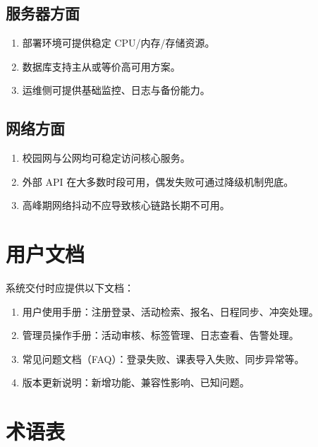 \documentclass[UTF8,a4paper,12pt,fontset=none]{ctexrep}
\begin{document}
\subsection{服务器方面}

\begin{enumerate}[leftmargin=2.5em]
\item 部署环境可提供稳定 CPU/内存/存储资源。
\item 数据库支持主从或等价高可用方案。
\item 运维侧可提供基础监控、日志与备份能力。
\end{enumerate}

\subsection{网络方面}

\begin{enumerate}[leftmargin=2.5em]
\item 校园网与公网均可稳定访问核心服务。
\item 外部 API 在大多数时段可用，偶发失败可通过降级机制兜底。
\item 高峰期网络抖动不应导致核心链路长期不可用。
\end{enumerate}

\section{用户文档}

系统交付时应提供以下文档：

\begin{enumerate}[leftmargin=2.5em]
\item 用户使用手册：注册登录、活动检索、报名、日程同步、冲突处理。
\item 管理员操作手册：活动审核、标签管理、日志查看、告警处理。
\item 常见问题文档（FAQ）：登录失败、课表导入失败、同步异常等。
\item 版本更新说明：新增功能、兼容性影响、已知问题。
\end{enumerate}

\section{术语表}
\end{document}
